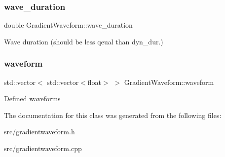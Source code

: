 \subsubsection{\texorpdfstring{wave\+\_\+duration}{wave\_duration}}
{\footnotesize\ttfamily double Gradient\+Waveform\+::wave\+\_\+duration}

Wave duration (should be less qeual than dyn\+\_\+dur.) \mbox{\label{class_gradient_waveform_a565fce08abb28fe26664194c04faeaea}} 
\subsubsection{\texorpdfstring{waveform}{waveform}}
{\footnotesize\ttfamily std\+::vector$<$ std\+::vector$<$float$>$ $>$ Gradient\+Waveform\+::waveform}

Defined waveforms 

The documentation for this class was generated from the following files\+:\begin{DoxyCompactItemize}
\item 
src/gradientwaveform.\+h\item 
src/gradientwaveform.\+cpp\end{DoxyCompactItemize}
